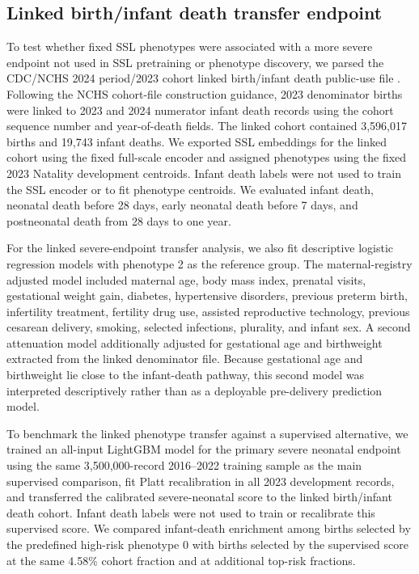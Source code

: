 \documentclass[pdflatex,sn-vancouver-num]{sn-jnl}
\begin{document}
\subsection{Linked birth/infant death transfer endpoint}\label{subsec:linked-infant-death}

To test whether fixed SSL phenotypes were associated with a more severe endpoint not used in SSL pretraining or phenotype discovery, we parsed the CDC/NCHS 2024 period/2023 cohort linked birth/infant death public-use file \cite{nchs_linked_2024_userguide}. Following the NCHS cohort-file construction guidance, 2023 denominator births were linked to 2023 and 2024 numerator infant death records using the cohort sequence number and year-of-death fields. The linked cohort contained 3,596,017 births and 19,743 infant deaths. We exported SSL embeddings for the linked cohort using the fixed full-scale encoder and assigned phenotypes using the fixed 2023 Natality development centroids. Infant death labels were not used to train the SSL encoder or to fit phenotype centroids. We evaluated infant death, neonatal death before 28 days, early neonatal death before 7 days, and postneonatal death from 28 days to one year.

For the linked severe-endpoint transfer analysis, we also fit descriptive logistic regression models with phenotype 2 as the reference group. The maternal-registry adjusted model included maternal age, body mass index, prenatal visits, gestational weight gain, diabetes, hypertensive disorders, previous preterm birth, infertility treatment, fertility drug use, assisted reproductive technology, previous cesarean delivery, smoking, selected infections, plurality, and infant sex. A second attenuation model additionally adjusted for gestational age and birthweight extracted from the linked denominator file. Because gestational age and birthweight lie close to the infant-death pathway, this second model was interpreted descriptively rather than as a deployable pre-delivery prediction model.

To benchmark the linked phenotype transfer against a supervised alternative, we trained an all-input LightGBM model for the primary severe neonatal endpoint using the same 3,500,000-record 2016--2022 training sample as the main supervised comparison, fit Platt recalibration in all 2023 development records, and transferred the calibrated severe-neonatal score to the linked birth/infant death cohort. Infant death labels were not used to train or recalibrate this supervised score. We compared infant-death enrichment among births selected by the predefined high-risk phenotype 0 with births selected by the supervised score at the same 4.58\% cohort fraction and at additional top-risk fractions.
\end{document}
